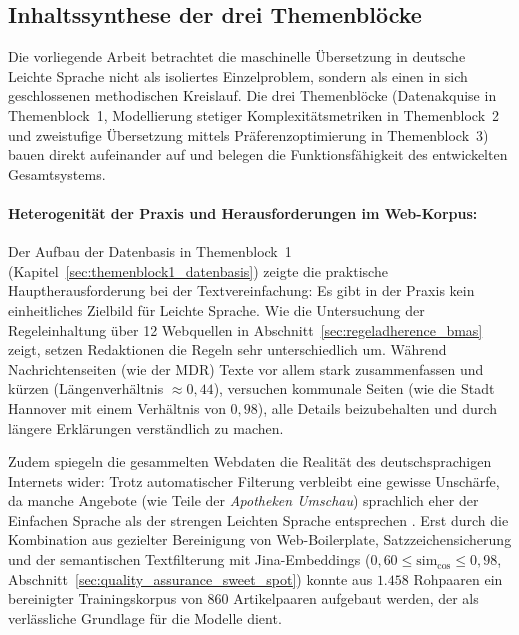 \subsection{Inhaltssynthese der drei Themenblöcke}
\label{sec:diskussion_synthese}

Die vorliegende Arbeit betrachtet die maschinelle Übersetzung in deutsche Leichte Sprache nicht als isoliertes Einzelproblem, sondern als einen in sich geschlossenen methodischen Kreislauf. Die drei Themenblöcke (Datenakquise in Themenblock~1, Modellierung stetiger Komplexitätsmetriken in Themenblock~2 und zweistufige Übersetzung mittels Präferenzoptimierung in Themenblock~3) bauen direkt aufeinander auf und belegen die Funktionsfähigkeit des entwickelten Gesamtsystems.

\paragraph{Heterogenität der Praxis und Herausforderungen im Web-Korpus:}
Der Aufbau der Datenbasis in Themenblock~1 (Kapitel~\ref{sec:themenblock1_datenbasis}) zeigte die praktische Hauptherausforderung bei der Textvereinfachung: Es gibt in der Praxis kein einheitliches Zielbild für Leichte Sprache. Wie die Untersuchung der Regeleinhaltung über 12 Webquellen in Abschnitt~\ref{sec:regeladherence_bmas} zeigt, setzen Redaktionen die Regeln sehr unterschiedlich um. Während Nachrichtenseiten (wie der MDR) Texte vor allem stark zusammenfassen und kürzen (Längenverhältnis $\approx 0{,}44$), versuchen kommunale Seiten (wie die Stadt Hannover mit einem Verhältnis von $0{,}98$), alle Details beizubehalten und durch längere Erklärungen verständlich zu machen.

Zudem spiegeln die gesammelten Webdaten die Realität des deutschsprachigen Internets wider: Trotz automatischer Filterung verbleibt eine gewisse Unschärfe, da manche Angebote (wie Teile der \textit{Apotheken Umschau}) sprachlich eher der Einfachen Sprache als der strengen Leichten Sprache entsprechen \citep{toborek2023new}. Erst durch die Kombination aus gezielter Bereinigung von Web-Boilerplate, Satzzeichensicherung und der semantischen Textfilterung mit Jina-Embeddings ($0{,}60 \le \text{sim}_{\cos} \le 0{,}98$, Abschnitt~\ref{sec:quality_assurance_sweet_spot}) konnte aus $1.458$ Rohpaaren ein bereinigter Trainingskorpus von $860$ Artikelpaaren aufgebaut werden, der als verlässliche Grundlage für die Modelle dient.

